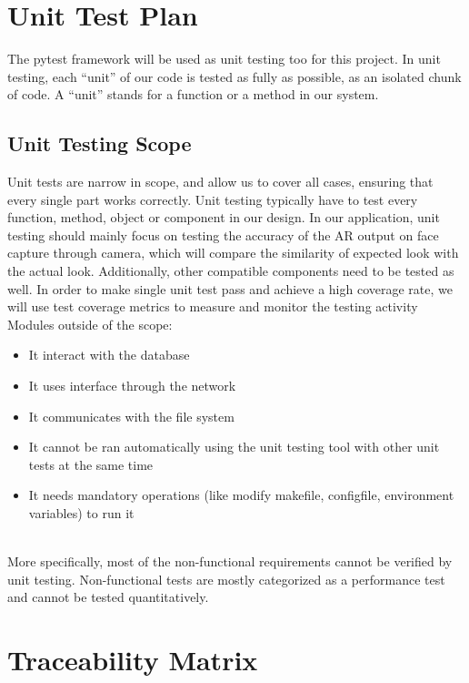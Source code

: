 \documentclass[12pt, titlepage]{article}
\begin{document}
\section{Unit Test Plan}
The pytest framework will be used as unit testing too for this project. In unit testing, each “unit” of our code is tested as fully as possible, as an isolated chunk of code. A “unit” stands for a function or a method in our system.


\subsection{Unit Testing Scope}
Unit tests are narrow in scope, and allow us to cover all cases, ensuring that every single part works correctly. Unit testing typically have to test every function, method, object or component in our design. In our application, unit testing should mainly focus on testing the accuracy of the AR output on face capture through camera, which will compare the similarity of expected look with the actual look. Additionally, other compatible components need to be tested as well. In order to make single unit test pass and achieve a high coverage rate, we will use test coverage metrics to measure and monitor the testing activity\\



\newline Modules outside of the scope:
\begin{itemize}
    \item It interact with the database
    \item It uses interface through the network
    \item It communicates with the file system
    \item It cannot be ran automatically using the unit testing tool with other unit tests at the same time
    \item It needs mandatory operations (like modify makefile, configfile, environment variables) to run it
\end{itemize}\\

More specifically, most of the non-functional requirements cannot be verified by unit testing. Non-functional tests are mostly categorized as a performance test and cannot be tested quantitatively.

  

\section{Traceability Matrix}
\end{document}

